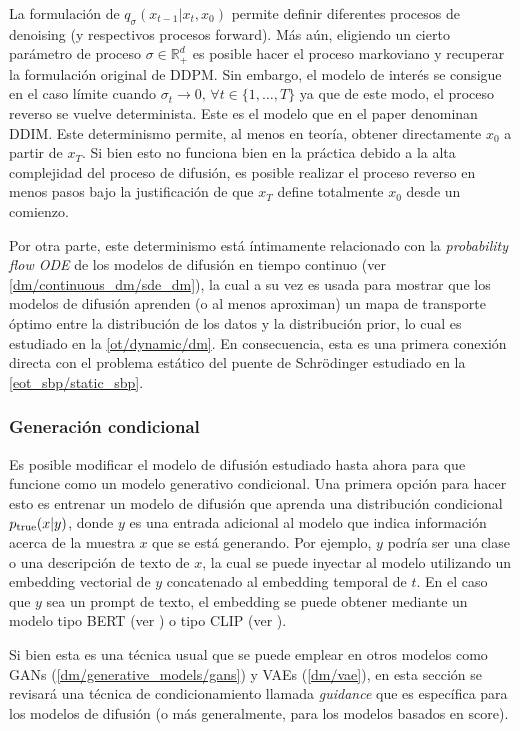 La formulación de $q_\sigma(x_{t-1}|x_t,x_0)$ permite definir diferentes procesos de denoising (y respectivos procesos forward). Más aún, eligiendo un cierto parámetro de proceso $\sigma\in\mathbb{R}^d_+$ es posible hacer el proceso markoviano y recuperar la formulación original de DDPM. Sin embargo, el modelo de interés se consigue en el caso límite cuando $\sigma_t\to 0,\,\forall t\in\{1,\ldots, T\}$ ya que de este modo, el proceso reverso se vuelve determinista. Este es el modelo que en el paper denominan DDIM. Este determinismo permite, al menos en teoría, obtener directamente $x_0$ a partir de $x_T$. Si bien esto no funciona bien en la práctica debido a la alta complejidad del proceso de difusión, es posible realizar el proceso reverso en menos pasos bajo la justificación de que $x_T$ define totalmente $x_0$ desde un comienzo.

Por otra parte, este determinismo está íntimamente relacionado con la \textit{probability flow ODE} de los modelos de difusión en tiempo continuo (ver \autoref{dm/continuous_dm/sde_dm}), la cual a su vez es usada para mostrar que los modelos de difusión aprenden (o al menos aproximan) un mapa de transporte óptimo entre la distribución de los datos y la distribución prior, lo cual es estudiado en la \autoref{ot/dynamic/dm}. En consecuencia, esta es una primera conexión directa con el problema estático del puente de Schrödinger estudiado en la \autoref{eot_sbp/static_sbp}.

\subsubsection{Generación condicional}

Es posible modificar el modelo de difusión estudiado hasta ahora para que funcione como un modelo generativo condicional. Una primera opción para hacer esto es entrenar un modelo de difusión que aprenda una distribución condicional $p_{\operatorname{true}}(x|y)$, donde $y$ es una entrada adicional al modelo que indica información acerca de la muestra $x$ que se está generando. Por ejemplo, $y$ podría ser una clase o una descripción de texto de $x$, la cual se puede inyectar al modelo utilizando un embedding vectorial de $y$ concatenado al embedding temporal de $t$. En el caso que $y$ sea un prompt de texto, el embedding se puede obtener mediante un modelo tipo BERT (ver \cite{devlin2019bertpretrainingdeepbidirectional}) o tipo CLIP (ver \cite{radford2021learningtransferablevisualmodels}).

Si bien esta es una técnica usual que se puede emplear en otros modelos como GANs (\autoref{dm/generative_models/gans}) y VAEs (\autoref{dm/vae}), en esta sección se revisará una técnica de condicionamiento llamada \textit{guidance} que es específica para los modelos de difusión (o más generalmente, para los modelos basados en score).

